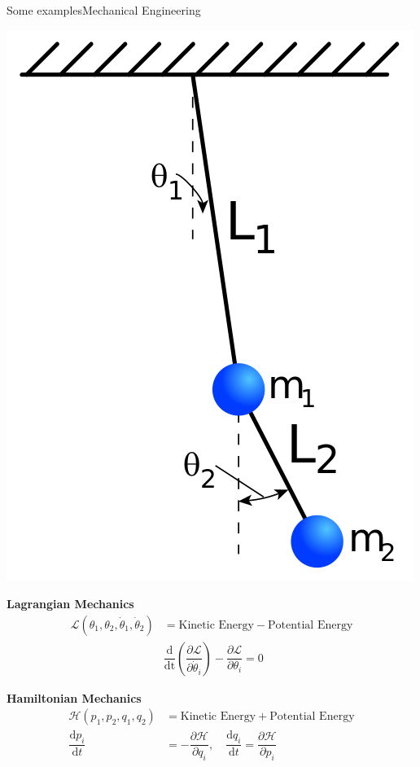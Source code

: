 \documentclass[usenames,dvipsnames,svgnames,10pt,aspectratio=169]{beamer}
\begin{document}
\begin{frame}[t, c]{Some examples}{Mechanical Engineering}
	\begin{minipage}{.28\textwidth}
		\centering
		\includegraphics[width=.9\textwidth]{double_pendulum_geometry}
	\end{minipage}%
	\hfill
	\begin{minipage}{.68\textwidth}
    \centering
    \textbf{Lagrangian Mechanics}
    \[
    \begin{aligned}
      \mathcal{L}(\theta_1, \theta_2, \dot{\theta}_1, \dot{\theta}_2) & = \text{Kinetic Energy} - \text{Potential Energy} \\
      & \dfrac{\mathrm{d}}{\mathrm{dt}} \left( \dfrac{\partial \mathcal{L}}{\partial \dot{\theta}_i} \right) - \dfrac{\partial \mathcal{L}}{\partial \theta_i}  = 0
    \end{aligned}
    \]

    \medskip

    \textbf{Hamiltonian Mechanics}
    \[
    \begin{aligned}
      \mathcal{H}(p_1, p_2, q_1, q_2) & = \text{Kinetic Energy} + \text{Potential Energy} \\
      \dfrac{\mathrm{d}p_i}{\mathrm{d}t} & = -\dfrac{\partial \mathcal{H}}{\partial q_i}, \quad \dfrac{\mathrm{d}q_i}{\mathrm{d}t} = \dfrac{\partial \mathcal{H}}{\partial p_i}
    \end{aligned}
    \]

	\end{minipage}

	\vspace{1cm}  
\end{frame}
\end{document}
